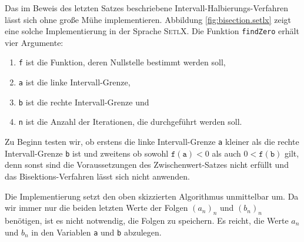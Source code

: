 \noindent
Das im Beweis des letzten Satzes beschriebene Intervall-Halbierungs-Verfahren l\"asst sich
ohne gro{\ss}e M\"uhe  implementieren.  Abbildung \ref{fig:bisection.setlx}
zeigt eine solche Implementierung in der Sprache \textsc{SetlX}.  Die Funktion \texttt{findZero}
erh\"alt vier Argumente:
\begin{enumerate}
\item \texttt{f} ist die Funktion, deren Nullstelle bestimmt werden soll,
\item \texttt{a} ist die linke Intervall-Grenze, 
\item \texttt{b} ist die rechte Intervall-Grenze und
\item \texttt{n} ist die Anzahl der Iterationen, die durchgef\"uhrt werden soll.
\end{enumerate}
Zu Beginn testen wir, ob erstens die linke Intervall-Grenze \texttt{a} kleiner als die rechte
Intervall-Grenze \texttt{b} ist und zweitens ob sowohl $\mathtt{f(a)} < 0$ als auch $0 < \mathtt{f(b)}$ gilt, denn sonst sind
die Voraussetzungen des Zwischenwert-Satzes nicht erf\"ullt und das Bisektions-Verfahren l\"asst
sich nicht anwenden. 

Die Implementierung setzt den oben skizzierten Algorithmus unmittelbar um.  Da wir immer nur die
beiden letzten Werte der Folgen $(a_n)_n$ und $(b_n)_n$ ben\"otigen, ist es nicht notwendig, die
Folgen zu speichern.  Es reicht, die Werte $a_n$ und $b_n$ in den Variablen \texttt{a} und
\texttt{b} abzulegen. 


